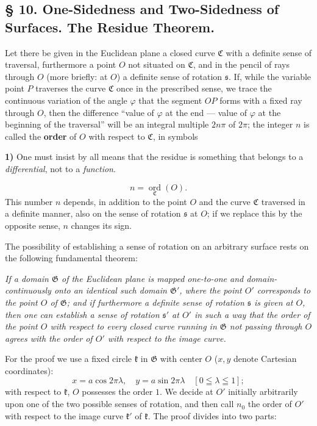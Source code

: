 \documentclass{article}
\begin{document}
\subsection*{§ 10. One-Sidedness and Two-Sidedness of Surfaces. The Residue Theorem.}

Let there be given in the Euclidean plane a closed curve $\mathfrak{C}$ with a definite sense of traversal, furthermore a point $O$ not situated on $\mathfrak{C}$, and in the pencil of rays through $O$ (more briefly: at $O$) a definite sense of rotation $\mathfrak{s}$. If, while the variable point $P$ traverses the curve $\mathfrak{C}$ once in the prescribed sense, we trace the continuous variation of the angle $\varphi$ that the segment $OP$ forms with a fixed ray through $O$, then the difference
``value of $\varphi$ at the end --- value of $\varphi$ at the beginning of the traversal''
will be an integral multiple $2n\pi$ of $2\pi$; the integer $n$ is called the \textbf{order} of $O$ with respect to $\mathfrak{C}$, in symbols

\textbf{1)} One must insist by all means that the residue is something that belongs to a \emph{differential}, not to a \emph{function}.

\[ n = \underset{\mathfrak{C}}{\operatorname{ord}}(O). \]
This number $n$ depends, in addition to the point $O$ and the curve $\mathfrak{C}$ traversed in a definite manner, also on the sense of rotation $\mathfrak{s}$ at $O$; if we replace this by the opposite sense, $n$ changes its sign.

The possibility of establishing a sense of rotation on an arbitrary surface rests on the following fundamental theorem:

\emph{If a domain $\mathfrak{G}$ of the Euclidean plane is mapped one-to-one and domain-continuously onto an identical such domain $\mathfrak{G}'$, where the point $O'$ corresponds to the point $O$ of $\mathfrak{G}$; and if furthermore a definite sense of rotation $\mathfrak{s}$ is given at $O$, then one can establish a sense of rotation $\mathfrak{s}'$ at $O'$ in such a way that the order of the point $O$ with respect to every closed curve running in $\mathfrak{G}$ not passing through $O$ agrees with the order of $O'$ with respect to the image curve.}

For the proof we use a fixed circle $\mathfrak{k}$ in $\mathfrak{G}$ with center $O$ ($x, y$ denote Cartesian coordinates):
\[ x = a \cos 2\pi\lambda, \quad y = a \sin 2\pi\lambda \quad [0 \leqq \lambda \leqq 1]; \]
with respect to $\mathfrak{k}$, $O$ possesses the order $1$. We decide at $O'$ initially arbitrarily upon one of the two possible senses of rotation, and then call $n_0$ the order of $O'$ with respect to the image curve $\mathfrak{k}'$ of $\mathfrak{k}$. The proof divides into two parts:
\end{document}
